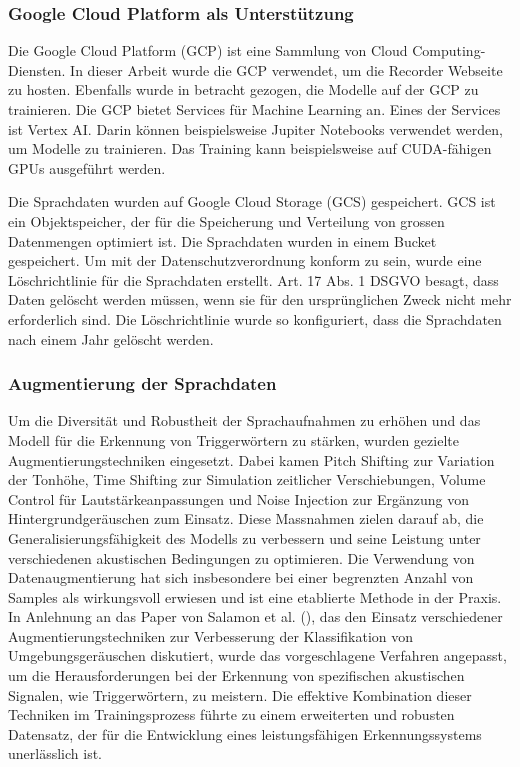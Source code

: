 \documentclass[11pt,a4paper]{article}
\begin{document}
\subsubsection{Google Cloud Platform als Unterstützung}
Die Google Cloud Platform (GCP) ist eine Sammlung von Cloud Computing-Diensten. In dieser Arbeit
wurde die GCP verwendet, um die Recorder Webseite zu hosten. Ebenfalls wurde in betracht gezogen,
die Modelle auf der GCP zu trainieren. Die GCP bietet Services für Machine Learning an. Eines der
Services ist Vertex AI. Darin können beispielsweise Jupiter Notebooks verwendet werden, um Modelle
zu trainieren. Das Training kann beispielsweise auf CUDA-fähigen GPUs ausgeführt werden.

\noindent \newline
Die Sprachdaten wurden auf Google Cloud Storage (GCS) gespeichert. GCS ist ein Objektspeicher, der
für die Speicherung und Verteilung von grossen Datenmengen optimiert ist. Die Sprachdaten wurden
in einem Bucket gespeichert. Um mit der Datenschutzverordnung konform zu sein, wurde eine 
Löschrichtlinie für die Sprachdaten erstellt. Art. 17 Abs. 1 DSGVO besagt, dass Daten gelöscht 
werden müssen, wenn sie für den ursprünglichen Zweck nicht mehr erforderlich sind. Die
Löschrichtlinie wurde so konfiguriert, dass die Sprachdaten nach einem Jahr gelöscht werden.


\subsubsection{Augmentierung der Sprachdaten} \label{sec:augmentierung}
Um die Diversität und Robustheit der Sprachaufnahmen zu erhöhen und das Modell für die Erkennung 
von Triggerwörtern zu stärken, wurden gezielte Augmentierungstechniken eingesetzt. Dabei kamen 
Pitch Shifting zur Variation der Tonhöhe, Time Shifting zur Simulation zeitlicher Verschiebungen, 
Volume Control für Lautstärkeanpassungen und Noise Injection zur Ergänzung von 
Hintergrundgeräuschen zum Einsatz. Diese Massnahmen zielen darauf ab, die Generalisierungsfähigkeit 
des Modells zu verbessern und seine Leistung unter verschiedenen akustischen Bedingungen zu 
optimieren. Die Verwendung von Datenaugmentierung hat sich insbesondere bei einer begrenzten 
Anzahl von Samples als wirkungsvoll erwiesen und ist eine etablierte Methode in der Praxis. In 
Anlehnung an das Paper von Salamon et al. (\cite{salamon2017deep}), das den Einsatz verschiedener 
Augmentierungstechniken zur Verbesserung der Klassifikation von Umgebungsgeräuschen diskutiert, 
wurde das vorgeschlagene Verfahren angepasst, um die Herausforderungen bei der Erkennung von 
spezifischen akustischen Signalen, wie Triggerwörtern, zu meistern. Die effektive Kombination 
dieser Techniken im Trainingsprozess führte zu einem erweiterten und robusten Datensatz, der für 
die Entwicklung eines leistungsfähigen Erkennungssystems unerlässlich ist.
\end{document}

